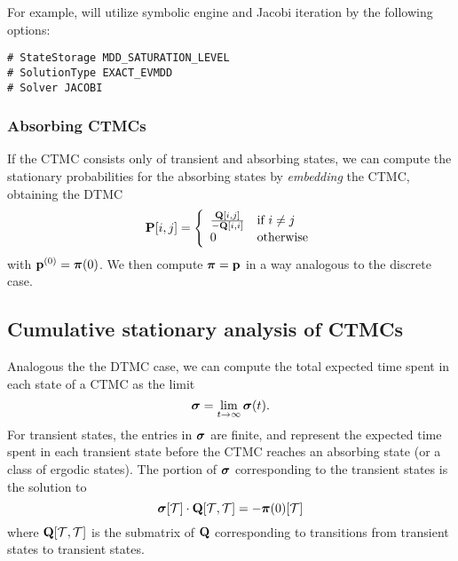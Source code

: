 For example, {\smart} will utilize symbolic engine and Jacobi iteration by the following options:

\begin{verbatim}
# StateStorage MDD_SATURATION_LEVEL
# SolutionType EXACT_EVMDD
# Solver JACOBI
\end{verbatim}


\subsubsection{Absorbing CTMCs}

If the CTMC consists only of transient and absorbing states,
we can compute the stationary probabilities
for the absorbing states by \emph{embedding} the CTMC, obtaining the DTMC
\[
  \P[i,j] = \left\{ \begin{array}{ll} %
             \frac{\Q[i,j]}{-\Q[i,i]}
             &
             \mbox{if $i\neq j$}
             \\
             0
             &
             \mbox{otherwise}
                  \end{array} \right.
\]
with $\mathbf{p}^{(0)} = \mbox{\boldmath{${\pi}$}}(0)$.
We then compute $\mbox{\boldmath{${\pi}$}} = \mathbf{p}$ in a way analogous to the
discrete case.

\subsection{Cumulative stationary analysis of CTMCs}
Analogous the the DTMC case, we can compute the total expected time spent in
each state of a CTMC as the limit
\[
\mbox{\boldmath{${\sigma}$}} = \lim_{t \rightarrow \infty} \mbox{\boldmath{${\sigma}$}}(t).
\]
For transient states, the entries in $\mbox{\boldmath{${\sigma}$}}$ are finite,
and represent the expected time spent in each transient state before
the CTMC reaches an absorbing state (or a class of ergodic states).
The portion of $\mbox{\boldmath{${\sigma}$}}$ corresponding to the transient states is the
solution to
\[
  \mbox{\boldmath{${\sigma}$}}[\mathcal{T}] \cdot \mathbf{Q}[\mathcal{T}, \mathcal{T}]
  = -\mbox{\boldmath{${\pi}$}}(0)[\mathcal{T}]
\]
where $\mathbf{Q}[\mathcal{T}, \mathcal{T}]$ is the submatrix of $\mathbf{Q}$
corresponding to transitions from transient states to transient states.

